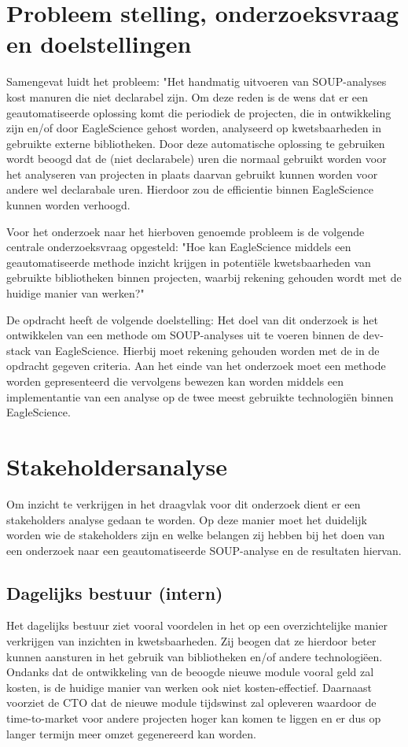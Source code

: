\section{Probleem stelling, onderzoeksvraag en doelstellingen}\label{sec:probleem-stelling-onderzoeksvraag-en-doelstellingen}
Samengevat luidt het probleem: "Het handmatig uitvoeren van SOUP-analyses kost manuren die niet declarabel zijn. Om deze reden is de wens dat er een geautomatiseerde oplossing komt die periodiek de projecten, die in ontwikkeling zijn en/of door EagleScience gehost worden, analyseerd op kwetsbaarheden in gebruikte externe bibliotheken. Door deze automatische oplossing te gebruiken wordt beoogd dat de (niet declarabele) uren die normaal gebruikt worden voor het analyseren van projecten in plaats daarvan gebruikt kunnen worden voor andere wel declarabale uren. Hierdoor zou de efficientie binnen EagleScience kunnen worden verhoogd.

Voor het onderzoek naar het hierboven genoemde probleem is de volgende centrale onderzoeksvraag opgesteld: "Hoe kan EagleScience middels een geautomatiseerde methode inzicht krijgen in potentiële kwetsbaarheden van gebruikte bibliotheken binnen projecten, waarbij rekening gehouden wordt met de huidige manier van werken?"

De opdracht heeft de volgende doelstelling:
Het doel van dit onderzoek is het ontwikkelen van een methode om SOUP-analyses uit te voeren binnen de dev-stack van EagleScience. Hierbij moet rekening gehouden worden met de in de opdracht gegeven criteria. Aan het einde van het onderzoek moet een methode worden gepresenteerd die vervolgens bewezen kan worden middels een implementantie van een analyse op de twee meest gebruikte technologiën binnen EagleScience.


\section{Stakeholdersanalyse}\label{sec:stakeholdersanalyse}
Om inzicht te verkrijgen in het draagvlak voor dit onderzoek dient er een stakeholders analyse gedaan te worden. Op deze manier moet het duidelijk worden wie de stakeholders zijn en welke belangen zij hebben bij het doen van een onderzoek naar een geautomatiseerde SOUP-analyse en de resultaten hiervan.

\subsection{Dagelijks bestuur (intern)}\label{subsec:dagelijks-bestuur-(intern)1}
Het dagelijks bestuur ziet vooral voordelen in het op een overzichtelijke manier verkrijgen van inzichten in kwetsbaarheden. Zij beogen dat ze hierdoor beter kunnen aansturen in het gebruik van bibliotheken en/of andere technologiëen. Ondanks dat de ontwikkeling van de beoogde nieuwe module vooral geld zal kosten, is de huidige manier van werken ook niet kosten-effectief. Daarnaast voorziet de CTO dat de nieuwe module tijdswinst zal opleveren waardoor de time-to-market voor andere projecten hoger kan komen te liggen en er dus op langer termijn meer omzet gegenereerd kan worden.

